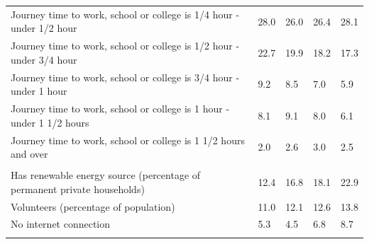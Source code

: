 \documentclass{article}
\begin{document}
\begin{table}[h]
\begin{tabular}{KTTTT}
Journey time to work, school or college is 1/4 hour - under 1/2 hour & 28.0& 26.0& 26.4& 28.1\\
Journey time to work, school or college is 1/2 hour - under 3/4 hour & 22.7& 19.9& 18.2& 17.3\\
Journey time to work, school or college is 3/4 hour - under 1 hour & 9.2& 8.5& 7.0& 5.9\\
Journey time to work, school or college is 1 hour - under 1 1/2 hours & 8.1& 9.1& 8.0& 6.1\\
Journey time to work, school or college is 1 1/2 hours and over & 2.0& 2.6& 3.0& 2.5\\
\hline
    \\ 
    \hline
Has renewable energy source (percentage of permanent private households) & 12.4& 16.8& 18.1& 22.9\\
    \hline
Volunteers (percentage of population) & 11.0& 12.1& 12.6& 13.8\\
    \hline
No internet connection& 5.3& 4.5& 6.8& 8.7\\
\hline
\end{tabular}
\end{table}
\end{document}

